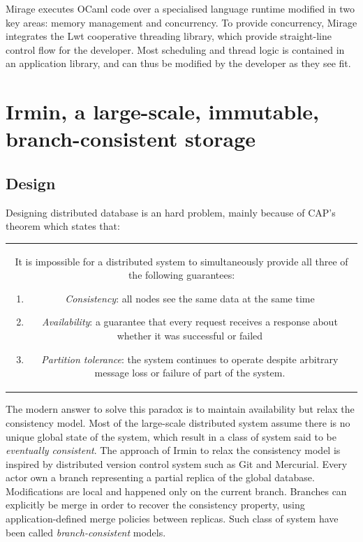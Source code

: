 \documentclass{article}
\renewcommand{\-}{\hyp}
\newcommand{\irmin}{Irmin\xspace}
\newcommand{\git}{Git\xspace}
\newcommand{\lwt}{Lwt\xspace}
\newcommand{\mercurial}{Mercurial\xspace}
\newcommand{\mirage}{Mirage\xspace}
\newcommand{\ocaml}{OCaml\xspace}
\begin{document}
\mirage executes \ocaml code over a specialised language runtime modified in two key areas: memory management and concurrency.
To provide concurrency, \mirage integrates the \lwt cooperative threading library, which provide straight-line control flow for the developer.
Most scheduling and thread logic is contained in an application library, and can thus be modified by the developer as they see fit\cite{LibraryOperatingSystemsCloud2013}.



\section{\irmin, a large-scale, immutable, branch-consistent storage}

\subsection{Design}

Designing distributed database is an hard problem, mainly because of CAP’s theorem\cite{BrewerConjecture2002} which states that:

\bigskip
\begin{tabular}{|c}
\begin{minipage}{0.9\textwidth}
It is impossible for a distributed system to simultaneously provide all three of the following guarantees:
\begin{enumerate}
	\item \emph{Consistency}: all nodes see the same data at the same time
	\item \emph{Availability}: a guarantee that every request receives a response about whether it was successful or failed
	\item \emph{Partition tolerance}: the system continues to operate despite arbitrary message loss or failure of part of the system.
\end{enumerate} 
\end{minipage}
\end{tabular}
\bigskip

The modern answer to solve this paradox is to maintain availability but relax the consistency model.
Most of the large-scale distributed system assume there is no unique global state of the system, which result in a class of system said to be \emph{eventually consistent}\cite{EventuallyConsistentTransactions2012}.
The approach of \irmin to relax the consistency model is inspired by distributed version control system such as \git and \mercurial.
Every actor own a branch representing a partial replica of the global database.
Modifications are local and happened only on the current branch.
Branches can explicitly be merge in order to recover the consistency property, using application-defined merge policies between replicas.
Such class of system have been called \emph{branch-consistent} models.
\end{document}
